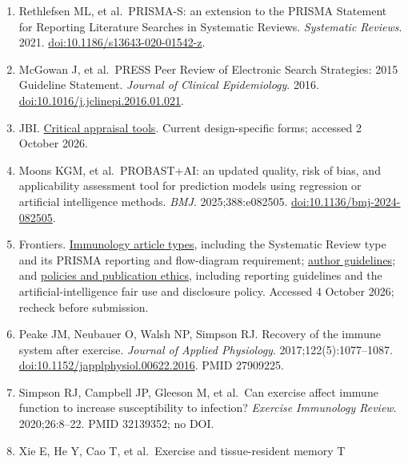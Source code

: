 \documentclass[
  11pt,
  a4paper,
]{article}
\begin{document}
\begin{enumerate}
  Tricco AC, et al.~PRISMA Extension for Scoping Reviews (PRISMA-ScR):
  Checklist and Explanation. \emph{Annals of Internal Medicine}. 2018.
  \href{https://doi.org/10.7326/M18-0850}{doi:10.7326/M18-0850}.
\item
  Rethlefsen ML, et al.~PRISMA-S: an extension to the PRISMA Statement
  for Reporting Literature Searches in Systematic Reviews.
  \emph{Systematic Reviews}. 2021.
  \href{https://doi.org/10.1186/s13643-020-01542-z}{doi:10.1186/s13643-020-01542-z}.
\item
  McGowan J, et al.~PRESS Peer Review of Electronic Search Strategies:
  2015 Guideline Statement. \emph{Journal of Clinical Epidemiology}.
  2016.
  \href{https://doi.org/10.1016/j.jclinepi.2016.01.021}{doi:10.1016/j.jclinepi.2016.01.021}.
\item
  JBI. \href{https://jbi.global/critical-appraisal-tools}{Critical
  appraisal tools}. Current design-specific forms; accessed 2 October
  2026.
\item
  Moons KGM, et al.~PROBAST+AI: an updated quality, risk of bias, and
  applicability assessment tool for prediction models using regression
  or artificial intelligence methods. \emph{BMJ}. 2025;388:e082505.
  \href{https://doi.org/10.1136/bmj-2024-082505}{doi:10.1136/bmj-2024-082505}.
\item
  Frontiers.
  \href{https://www.frontiersin.org/journals/immunology/for-authors/article-types}{Immunology
  article types}, including the Systematic Review type and its PRISMA
  reporting and flow-diagram requirement;
  \href{https://www.frontiersin.org/guidelines/author-guidelines}{author
  guidelines}; and
  \href{https://www.frontiersin.org/guidelines/policies-and-publication-ethics\#artificial-intelligence-policy}{policies
  and publication ethics}, including reporting guidelines and the
  artificial-intelligence fair use and disclosure policy. Accessed 4
  October 2026; recheck before submission.
\item
  Peake JM, Neubauer O, Walsh NP, Simpson RJ. Recovery of the immune
  system after exercise. \emph{Journal of Applied Physiology}.
  2017;122(5):1077--1087.
  \href{https://doi.org/10.1152/japplphysiol.00622.2016}{doi:10.1152/japplphysiol.00622.2016}.
  PMID 27909225.
\item
  Simpson RJ, Campbell JP, Gleeson M, et al.~Can exercise affect immune
  function to increase susceptibility to infection? \emph{Exercise
  Immunology Review}. 2020;26:8--22. PMID 32139352; no DOI.
\item
  Xie E, He Y, Cao T, et al.~Exercise and tissue-resident memory T

\end{enumerate}
\end{document}
